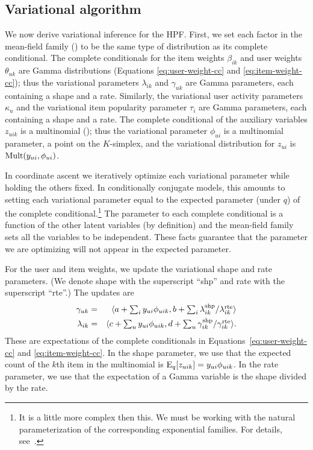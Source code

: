 \subsection{Variational algorithm}
We now derive variational inference for the HPF. First, we set each
factor in the mean-field family () to be the same type of
distribution as its complete conditional.  The complete conditionals
for the item weights $\beta_{ik}$ and user weights $\theta_{uk}$ are
Gamma distributions (Equations \ref{eq:user-weight-cc} and
\ref{eq:item-weight-cc}); thus the variational parameters
$\lambda_{ik}$ and $\gamma_{uk}$ are Gamma parameters, each containing
a shape and a rate.  Similarly, the variational user activity
parameters $\kappa_u$ and the variational item popularity parameter
$\tau_i$ are Gamma parameters, each containing a shape and a rate.
The complete conditional of the auxiliary variables $z_{uik}$ is a
multinomial (); thus the variational parameter
$\phi_{ui}$ is a multinomial parameter, a point on the $K$-simplex,
and the variational distribution for $z_{ui}$ is $\textrm{Mult}(y_{ui},
\phi_{ui})$.

In coordinate ascent we iteratively optimize each variational
parameter while holding the others fixed.  In conditionally conjugate
models, this amounts to setting each variational parameter equal to
the expected parameter (under $q$) of the complete
conditional.\footnote{It is a little more complex then this.  We must
  be working with the natural parameterization of the corresponding
  exponential families.  For details, see~\cite{Hoffman:2013}.}  The
parameter to each complete conditional is a function of the other
latent variables (by definition) and the mean-field family sets all
the variables to be independent.  These facts guarantee that the
parameter we are optimizing will not appear in the expected parameter.


For the user and item weights, we update the variational shape and
rate parameters.  (We denote shape with the superscript ``shp'' and
rate with the superscript ``rte''.) The updates are
\begin{eqnarray}
  \gamma_{uk} &=& \langle a + \textstyle \sum_{i} y_{ui} \phi_{uik},
  b + \textstyle \sum_i \lambda_{ik}^{\textrm{shp}} / \lambda_{ik}^{\textrm{rte}} \rangle \\
  \lambda_{ik} &=& \langle c + \textstyle \sum_{u} y_{ui} \phi_{uik},
  d + \textstyle \sum_u \gamma_{ik}^{\textrm{shp}} / \gamma_{ik}^{\textrm{rte}} \rangle.
\end{eqnarray}
These are expectations of the complete conditionals in
Equations~\ref{eq:user-weight-cc} and \ref{eq:item-weight-cc}.  In the
shape parameter, we use that the expected count of the $k$th item in
the multinomial is $\textrm{E}_q[z_{uik}] = y_{ui} \phi_{uik}$. In the rate
parameter, we use that the expectation of a Gamma variable is the
shape divided by the rate.

